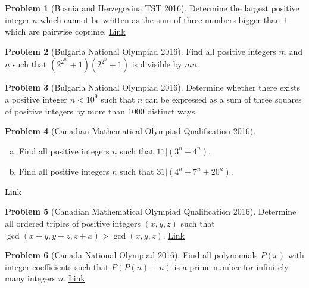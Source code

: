 \documentclass[]{article}
\theoremstyle{definition}
\newtheorem{problem}{Problem}
\begin{document}
	
\begin{problem}[Bosnia and Herzegovina TST 2016]
	Determine the largest positive integer $n$ which cannot be written as the sum of three numbers bigger than $1$ which are pairwise coprime. \hfill \href{http://artofproblemsolving.com/community/c6h1243220p6360359}{Link}
\end{problem}



\begin{problem}[Bulgaria National Olympiad 2016]
	Find all positive integers $m$ and $n$ such that $\left(2^{2^m}+1\right)\left(2^{2^n}+1\right)$ is divisible by $mn$.
\end{problem}


\begin{problem}[Bulgaria National Olympiad 2016]
	Determine whether there exists a positive integer $n<10^9$ such that $n$ can be expressed as a sum of three squares of positive integers by more than $1000$ distinct ways.
\end{problem}


\begin{problem}[Canadian Mathematical Olympiad Qualification 2016]
	$ $
	\begin{enumerate}[(a)]
		\item Find all positive integers $n$ such that $11|(3^n + 4^n)$.
		\item Find all positive integers $n$ such that $31|(4^n + 7^n + 20^n)$.
	\end{enumerate}
	\flushright \href{http://artofproblemsolving.com/community/c6h1259325p6529513}{Link}
\end{problem}



\begin{problem}[Canadian Mathematical Olympiad Qualification 2016]
	Determine all ordered triples of positive integers $(x, y, z)$ such that $\gcd(x+y, y+z, z+x) > \gcd(x, y, z)$. \hfill \href{http://artofproblemsolving.com/community/c6h1259332p6529539}{Link}
\end{problem}




\begin{problem}[Canada National Olympiad 2016]
	Find all polynomials $P(x)$ with integer coefficients such that $P(P(n) + n)$ is a prime number for infinitely many integers $n$. \hfill \href{http://artofproblemsolving.com/community/c6h1225741p6160566}{Link}
\end{problem}
\end{document}
